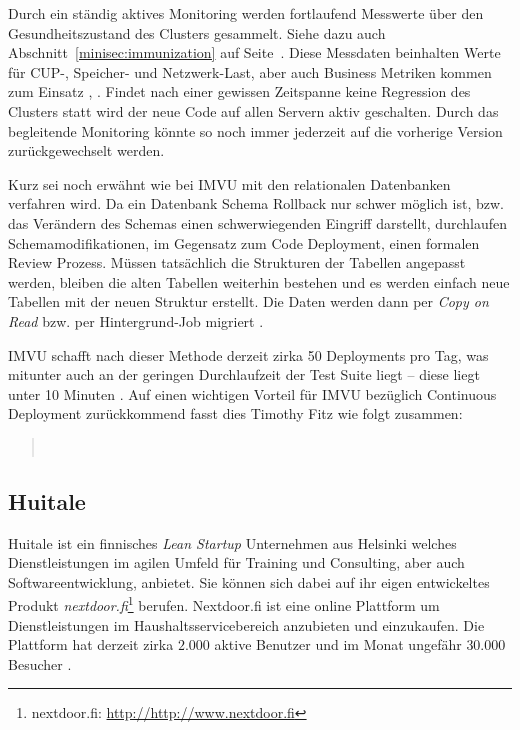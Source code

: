 Durch ein ständig aktives Monitoring werden fortlaufend Messwerte über den
Gesundheitszustand des Clusters gesammelt. Siehe dazu auch
Abschnitt~\ref{minisec:immunization} auf Seite~\pageref{minisec:immunization}.
Diese Messdaten beinhalten Werte für CUP-, Speicher- und Netzwerk-Last, aber
auch Business Metriken kommen zum Einsatz \cite{Fitz2009-02-10},
\cite{imvu09}. Findet nach einer gewissen Zeitspanne keine Regression des
Clusters statt wird der neue Code auf allen Servern aktiv geschalten. Durch
das begleitende Monitoring könnte so noch immer jederzeit auf die vorherige
Version zurückgewechselt werden.

Kurz sei noch erwähnt wie bei IMVU mit den relationalen Datenbanken verfahren
wird. Da ein Datenbank Schema Rollback nur schwer möglich ist, bzw. das
Verändern des Schemas einen schwerwiegenden Eingriff darstellt, durchlaufen
Schemamodifikationen, im Gegensatz zum Code Deployment, einen formalen Review
Prozess. Müssen tatsächlich die Strukturen der Tabellen angepasst werden,
bleiben die alten Tabellen weiterhin bestehen und es werden einfach neue
Tabellen mit der neuen Struktur erstellt. Die Daten werden dann per \emph{Copy
on Read} bzw. per Hintergrund-Job migriert \cite{imvu10}.

IMVU schafft nach dieser Methode derzeit zirka 50 Deployments pro Tag, was
mitunter auch an der geringen Durchlaufzeit der Test Suite liegt -- diese
liegt unter 10 Minuten \cite{Fitz2009-02-10}. Auf einen wichtigen
Vorteil für IMVU bezüglich Continuous Deployment zurückkommend fasst dies
Timothy Fitz wie folgt zusammen:

\begin{quote}
~\cite{Fitz2009-02-08}
\end{quote}


\subsection{Huitale}

Huitale ist ein finnisches \emph{Lean Startup} Unternehmen aus Helsinki
welches Dienstleistungen im agilen Umfeld für Training und Consulting, aber
auch Softwareentwicklung, anbietet. Sie können sich dabei auf ihr eigen
entwickeltes Produkt \emph{nextdoor.fi}\footnote{nextdoor.fi:
\url{http://http://www.nextdoor.fi}} berufen. Nextdoor.fi ist eine online
Plattform um Dienstleistungen im Haushaltsservicebereich anzubieten und
einzukaufen. Die Plattform hat derzeit zirka $2.000$ aktive Benutzer und im
Monat ungefähr $30.000$ Besucher \cite{Taipale2010}.

